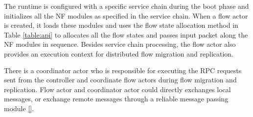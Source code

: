 The runtime is configured with a specific service chain during the boot phase and initializes all the NF modules as specified in the service chain. When a flow actor is created, it loads these modules and uses the flow state allocation method in Table \ref{table:api} to allocates all the flow states and passes input packet along the NF modules in sequence. Besides service chain processing, the flow actor also provides an execution context for distributed flow migration and replication.

There is a coordinator actor who is responsible for executing the RPC requests sent from the controller and coordinate flow actors during flow migration and replication. Flow actor and coordinator actor could directly exchanges local messages, or exchange remote messages through a reliable message passing module \ref{}.



